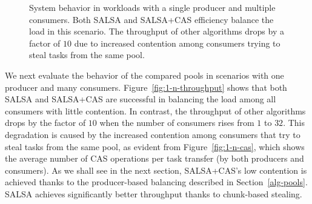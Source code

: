 \begin{figure}[htb]
	\centering
	\caption{\footnotesize{System behavior in workloads with a single producer and multiple consumers. 
	Both SALSA and SALSA+CAS efficiency balance the load in this scenario. The throughput of other algorithms drops by a factor of $10$ due to increased contention among consumers trying to steal tasks from the same pool.}}
	\label{fig:1-n-perf}
\end{figure}

We next evaluate the behavior of the compared pools in scenarios with one producer and many consumers. 
Figure~\ref{fig:1-n-throughput} shows that both SALSA and SALSA+CAS are successful in balancing the load among all consumers with little contention. In contrast, the throughput of other algorithms drops by the factor of $10$ when the number of consumers rises from $1$ to $32$. 
This degradation is caused by the increased contention among consumers that try to steal tasks from the same pool, as evident from Figure~\ref{fig:1-n-cas}, which shows the average number of CAS operations per task transfer (by both producers and consumers). As we shall see in the next section, SALSA+CAS's low contention is achieved thanks to the producer-based balancing described in Section~\ref{alg-pools}. SALSA achieves significantly better throughput thanks to chunk-based stealing.

